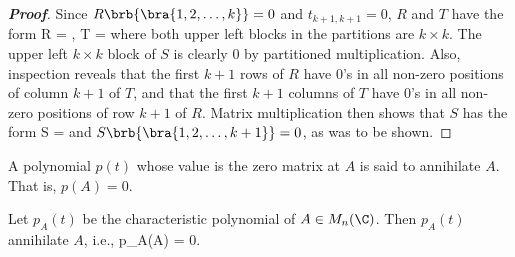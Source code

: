 \begin{proof}[\bf Proof]
Since $R\brb{\bra{1,2,\dots,k}} = 0$ and $t_{k+1,k+1} =0$, $R$ and $T$ have the form
\be
R =  ,\qquad
T = 
\ee
where both upper left blocks in the partitions are $k\times k$. The upper left $k\times k$ block of $S$ is clearly 0 by partitioned multiplication. Also, inspection reveals that the first $k+1$ rows
of $R$ have 0's in all non-zero positions of column $k+1$ of $T$, and that the first $k+1$ columns of $T$ have 0's in all non-zero positions of row $k+1$ of $R$. Matrix multiplication then shows that $S$ has the form
\be
S = 
\ee
and $S\brb{\bra{1,2,\dots,k+1}} = 0$, as was to be shown.
\end{proof}

\begin{definition}\label{def:annihilation_polynomial}
A polynomial $p(t)$ whose value is the zero matrix at $A$ is said to annihilate $A$. That is, $p(A) = 0$.
\end{definition}

\begin{theorem}\label{thm:cayley_hamilton}
Let $p_A(t)$ be the characteristic polynomial of $A\in M_n(\C)$. Then $p_A(t)$ annihilate $A$, i.e.,
\be
p_A(A) = 0.
\ee
\end{theorem}

